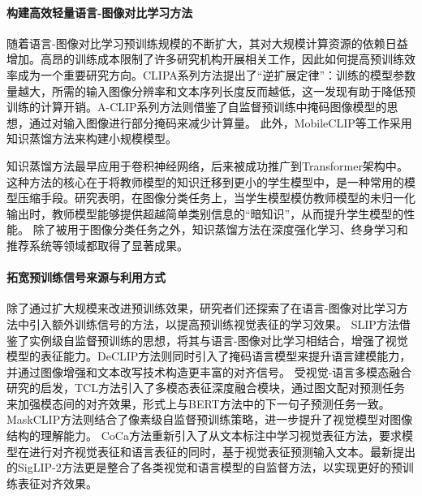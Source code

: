 \paragraph{构建高效轻量语言-图像对比学习方法}
随着语言-图像对比学习预训练规模的不断扩大，其对大规模计算资源的依赖日益增加。高昂的训练成本限制了许多研究机构开展相关工作，因此如何提高预训练效率成为一个重要研究方向。CLIPA系列方法\cite{CLIPA,CLIPA-v2}提出了“逆扩展定律”：训练的模型参数量越大，所需的输入图像分辨率和文本序列长度反而越低，这一发现有助于降低预训练的计算开销。A-CLIP系列方法\cite{ACLIP,FLIP}则借鉴了自监督预训练中掩码图像模型的思想，通过对输入图像进行部分掩码来减少计算量。
此外，MobileCLIP\cite{MobileCLIP,TinyCLIP}等工作采用知识蒸馏方法\cite{hinton2015knowledge}来构建小规模模型。

知识蒸馏方法\cite{hinton2015knowledge,kim2018paraphrasing}最早应用于卷积神经网络，后来被成功推广到Transformer架构中\cite{deit,wang2020minilm}。这种方法的核心在于将教师模型的知识迁移到更小的学生模型中，是一种常用的模型压缩手段。研究表明，在图像分类任务上，当学生模型模仿教师模型的未归一化输出时，教师模型能够提供超越简单类别信息的“暗知识”\cite{furlanello2018born}，从而提升学生模型的性能。%
除了被用于图像分类任务之外，知识蒸馏方法在深度强化学习\cite{chaudhry2018riemannian}、终身学习\cite{zhai2019lifelong}和推荐系统\cite{chen2018adversarial}等领域都取得了显著成果。

\paragraph{拓宽预训练信号来源与利用方式} 
除了通过扩大规模来改进预训练效果，研究者们还探索了在语言-图像对比学习方法中引入额外训练信号的方法，以提高预训练视觉表征的学习效果。
SLIP方法\cite{SLIP}借鉴了实例级自监督预训练的思想，将其与语言-图像对比学习相结合，增强了视觉模型的表征能力。DeCLIP方法\cite{li2022supervision}则同时引入了掩码语言模型来提升语言建模能力，并通过图像增强和文本改写技术构造更丰富的对齐信号。
受视觉-语言多模态融合研究\cite{visualbert}的启发，TCL方法\cite{TCL}引入了多模态表征深度融合模块，通过图文配对预测任务来加强模态间的对齐效果，形式上与BERT方法中的下一句子预测任务一致。MaskCLIP方法\cite{he2022masked}则结合了像素级自监督预训练策略，进一步提升了视觉模型对图像结构的理解能力。
CoCa方法\cite{CoCa}重新引入了从文本标注中学习视觉表征方法\cite{desai2021virtex}，要求模型在进行对齐视觉表征和语言表征的同时，基于视觉表征预测输入文本。最新提出的SigLIP-2方法\cite{siglip-2}更是整合了各类视觉和语言模型的自监督方法，以实现更好的预训练表征对齐效果。

